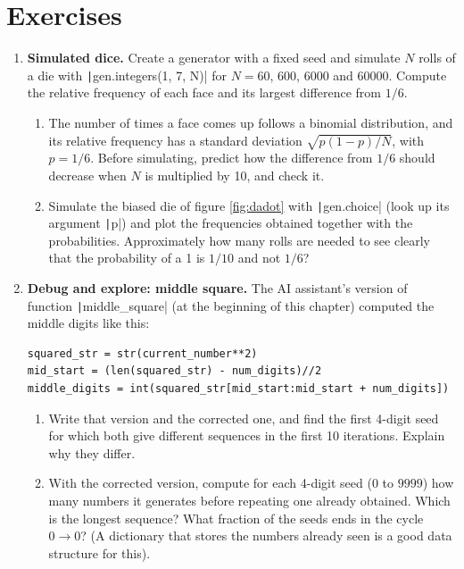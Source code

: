 \section{Exercises}
\begin{enumerate}
\item \label{ej:dado-en} \textbf{Simulated dice.} Create a generator with a fixed seed and simulate $N$ rolls of a die with \texttt|gen.integers(1, 7, N)| for $N=60$, $600$, $6000$ and $60000$. Compute the relative frequency of each face and its largest difference from $1/6$.
\begin{enumerate}
\item The number of times a face comes up follows a binomial distribution, and its relative frequency has a standard deviation $\sqrt{p(1-p)/N}$, with $p=1/6$. Before simulating, predict how the difference from $1/6$ should decrease when $N$ is multiplied by 10, and check it.
\item Simulate the biased die of figure \ref{fig:dadot} with \texttt|gen.choice| (look up its argument \texttt|p|) and plot the frequencies obtained together with the probabilities. Approximately how many rolls are needed to see clearly that the probability of a 1 is $1/10$ and not $1/6$?
\end{enumerate}

\item \label{ej:middle_square-en} \textbf{Debug and explore: middle square.} The AI assistant's version of function \texttt|middle_square| (at the beginning of this chapter) computed the middle digits like this:
\begin{verbatim}
squared_str = str(current_number**2)
mid_start = (len(squared_str) - num_digits)//2
middle_digits = int(squared_str[mid_start:mid_start + num_digits])
\end{verbatim}
\begin{enumerate}
\item Write that version and the corrected one, and find the first 4-digit seed for which both give different sequences in the first 10 iterations. Explain why they differ.
\item With the corrected version, compute for each 4-digit seed ($0$ to $9999$) how many numbers it generates before repeating one already obtained. Which is the longest sequence? What fraction of the seeds ends in the cycle $0 \rightarrow 0$? (A dictionary that stores the numbers already seen is a good data structure for this).
\end{enumerate}


\end{enumerate}
